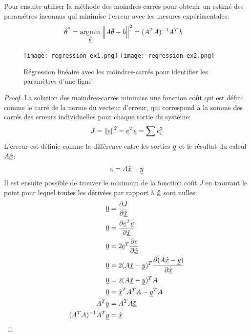 Pour ensuite utiliser la méthode des moindres-carrés pour obtenir un estimé des paramètres inconnus qui minimise l'erreur avec les mesures expérimentales:
\begin{align}
\col{\hat{\theta}}^* &= \operatornamewithlimits{argmin}\limits_{\col{\hat{\theta}}} \left\| A \col{\hat{\theta}} - \col{b} \right\|^2
= (A^T A)^{-1} A^T \, \col{b}
\end{align}



\begin{example}
\begin{figure}[H]
	\centering
		\texttt{[image: regression\_ex1.png]}
		\texttt{[image: regression\_ex2.png]}
	\caption{Régression linéaire avec les moindres-carrés pour identifier les paramètres d'une ligne}
	\label{fig:regression-ex1}
\end{figure}
\end{example}

\begin{proof}
La solution des moindres-carrés minimise une fonction coût qui est défini comme le carré de la norme du vecteur d'erreur, qui correspond à la somme des carrés des erreurs individuelles pour chaque sortie du système:
\begin{align}
J = \left\| \underline{e} \right\|^2  = \underline{e}^T\underline{e} = \sum{ e_i^2}
\end{align}
L'erreur est définie comme la différence entre les sorties $\underline{y}$ et le résultat du calcul $A \underline{\hat{x}}$:
\begin{align}
\underline{e} = A \underline{\hat{x}} - \underline{y}
\end{align}
Il est ensuite possible de trouver le minimum de la fonction coût $J$ en trouvant le point pour lequel toutes les dérivées par rapport à $\underline{\hat{x}}$ sont nulles:
\begin{align}
\underline{0} &= \frac{\partial J}{\partial \underline{\hat{x}}} \\
\underline{0} &= \frac{\partial \underline{e}^T\underline{e}}{\partial \underline{\hat{x}}} \\
\underline{0} &= 2 \underline{e}^T \frac{\partial e }{\partial \underline{\hat{x}}} \\
\underline{0} &= 2 ( A \underline{\hat{x}} -\underline{y} )^T \frac{\partial (A \underline{\hat{x}} -\underline{y}) }{\partial \underline{\hat{x}}} \\
\underline{0} &= 2 ( A \underline{\hat{x}} -\underline{y}  )^T A  \\
\underline{0} &=  \underline{\hat{x}}^T A^T A  - \underline{y}^T A   \\
A^T \underline{y} &= A^T A \underline{\hat{x}} \\
(A^T A)^{-1} A^T \underline{y} &= \underline{\hat{x}} 
\end{align}
\end{proof}

